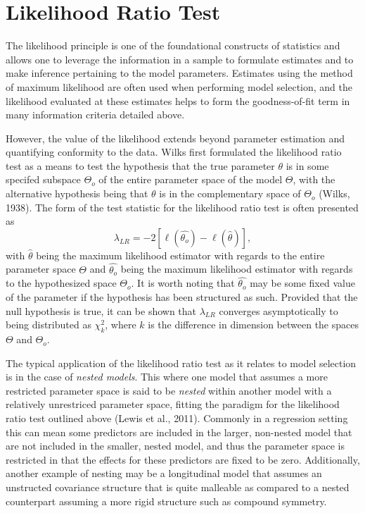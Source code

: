 		\section{Likelihood Ratio Test}

		The likelihood principle is one of the foundational constructs of statistics and allows one to leverage the information in a sample to formulate estimates and to make inference pertaining
		to the model parameters. Estimates using the method of maximum likelihood are often used when performing model selection, and the likelihood evaluated at
		these estimates helps to form the goodness-of-fit term in many information criteria detailed above.

		However, the value of the likelihood extends beyond parameter estimation and quantifying conformity to the data. Wilks first formulated the likelihood ratio test as a means to test the
		hypothesis that the true parameter $\theta$ is in some specifed subspace $\Theta_o$ of the entire parameter space of the model $\Theta$, with the alternative hypothesis being that
		$\theta$ is in the complementary space of $\Theta_o$ (Wilks, 1938). The form of the test statistic for the likelihood ratio test is often presented as
		\begin{equation}
			\lambda_{LR} = -2 \left[ \ell (\hat{\theta_o}) - \ell (\hat{\theta}) \right] ,
		\end{equation}
		with $\hat{\theta}$ being the maximum likelihood estimator with regards to the entire parameter space $\Theta$ and $\hat{\theta_o}$ being the maximum likelihood estimator with regards to the
		hypothesized space $\Theta_o$. It is worth noting that $\hat{\theta_o}$ may be some fixed value of the parameter if the hypothesis has been structured as such. Provided that the null hypothesis
		is true, it can be shown that $\lambda_{LR}$ converges asymptotically to being distributed as $\chi^2_{k}$, where $k$ is the difference in dimension between the spaces $\Theta$ and
		$\Theta_o$.

		The typical application of the likelihood ratio test as it relates to model selection is in the case of \textit{nested models}. This where one model that assumes a more restricted parameter
		space is said to be \textit{nested} within another model with a relatively unrestriced parameter space, fitting the paradigm for the likelihood ratio test outlined above (Lewis et al., 2011).
		Commonly in a regression setting this can mean some predictors are included in the larger, non-nested model that are not included in the smaller, nested model, and thus the parameter space is
		restricted in that the effects for these predictors are fixed to be zero. Additionally, another example of nesting may be a longitudinal model that assumes an unstructed covariance structure
		that is quite malleable as compared to a nested counterpart assuming a more rigid structure such as compound symmetry.

